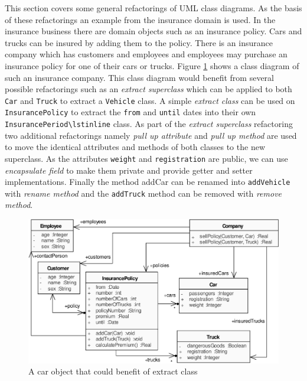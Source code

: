 \documentclass{llncs}
\begin{document}
This section covers some general refactorings of UML class diagrams. As the basis of these refactorings an example from the insurance
domain is used. In the insurance business there are domain objects such as an insurance policy. Cars and trucks can be insured by 
adding them to the policy. There is an insurance company which has customers and employees and employees may purchase an insurance policy 
for one of their cars or trucks. Figure \ref{fig:classdiagramcomplex} shows a class diagram of such an insurance company. This class 
diagram would benefit from several possible refactorings such as an \textit{extract superclass} which can be applied to both \lstinline|Car| and \lstinline|Truck| to extract a \lstinline|Vehicle| class. A simple \textit{extract class} can be used on \lstinline|InsurancePolicy| to 
extract the \lstinline|from| and \lstinline|until| dates into their own \lstinline|InsurancePeriod\lstinline| class. As part of the 
\textit{extract superclass} refactoring two additional refactorings namely \textit{pull up attribute} and \textit{pull up method} are 
used to move the identical attributes and methods of both classes to the new superclass. As the 
attributes \lstinline|weight| and \lstinline|registration| are public, we can use \textit{encapsulate field} to make them private and provide getter and setter implementations. Finally the method addCar can be renamed into \lstinline|addVehicle| with \textit{rename method} and the \lstinline|addTruck| method can be removed with \textit{remove method}.

\begin{figure}[h!t]
 \centering
 \includegraphics[scale=0.7]{images/ClassDiagramComplex.pdf}
 \caption{A car object that could benefit of extract class}
 \label{fig:classdiagramcomplex}
\end{figure}
\end{document}
